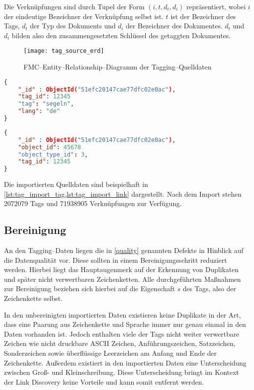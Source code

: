 Die Verknüpfungen sind durch Tupel der Form \((i, t, d_t, d_i)\) repräsentiert, wobei \(i\) der eindeutige Bezeichner der Verknüpfung selbst ist. \(t\) ist der Bezeichner des Tags, \(d_t\) der Typ des Dokuments und \(d_i\) der Bezeichner des Dokumentes. \(d_t\) und \(d_i\) bilden also den zusammengesetzten Schlüssel des getaggten Dokumentes. 
 
\begin{figure}
\centering
\texttt{[image: tag\_source\_erd]}
\caption{FMC--Entity--Relationship--Diagramm der Tagging--Quelldaten}
\label{fig:tag_source_erd}
\end{figure}

\begin{lstlisting}[language=json, label={lst:tag_import_tag}, caption={Beispiele für einen importierten Tag}]
{
    "_id" : ObjectId("51efc20147cae77dfc02e0ac"),
    "tag_id": 12345
    "tag": "segeln",
    "lang": "de"
}
\end{lstlisting}

\begin{lstlisting}[language=json, label={lst:tag_import_link}, caption={Beispiele für eine importierte Verknüpfung eines Tags mit einem Dokument}]
{
    "_id" : ObjectId("51efc20147cae77dfc02e0ac"),
    "object_id": 45678
    "object_type_id": 3,
    "tag_id": 12345
}
\end{lstlisting}

Die importierten Quelldaten sind beispielhaft in \cref{lst:tag_import_tag,lst:tag_import_link} dargestellt. Nach dem Import stehen \num{2072079} Tags und \num{71938905} Verknüpfungen zur Verfügung.

\subsection{Bereinigung}

An den Tagging--Daten liegen die in \cref{quality} genannten Defekte in Hinblick auf die Datenqualität vor. Diese sollten in einem Bereinigungsschritt reduziert werden. Hierbei liegt das Hauptaugenmerk auf der Erkennung von Duplikaten und später nicht verwertbaren Zeichenketten. Alle durchgeführten Maßnahmen zur Bereinigung beziehen sich hierbei auf die Eigenschaft \(s\) des Tags, also der Zeichenkette selbst.

In den unbereinigten importierten Daten existieren keine Duplikate in der Art, dass eine Paarung aus Zeichenkette und Sprache immer nur genau einmal in den Daten vorhanden ist. Jedoch enthalten viele der Tags nicht weiter verwertbare Zeichen wie nicht druckbare ASCII Zeichen, Anführungszeichen, Satzzeichen, Sonderzeichen sowie überflüssige Leerzeichen am Anfang und Ende der Zeichenkette. Außerdem existiert in den importierten Daten eine Unterscheidung zwischen Groß- und Kleinschreibung. Diese Unterscheidung bringt im Kontext der Link Discovery keine Vorteile und kann somit entfernt werden.

